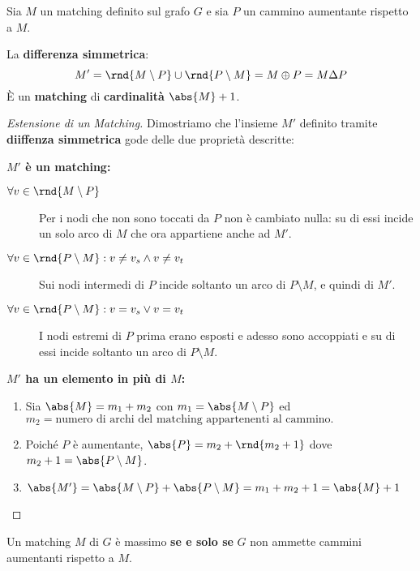 \documentclass[\main/main.tex]{subfiles}
\begin{document}
\begin{theorem}
	Sia \(M\) un matching definito sul grafo \(G\) e sia \(P\) un cammino aumentante rispetto a \(M\).

	La \textbf{differenza simmetrica}:
	\[
		M' = \rnd{M\setminus P} \cup \rnd{P\setminus M} = M \oplus P = M \Delta P
	\]
	È un \textbf{matching} di \textbf{cardinalità} \(\abs{M} + 1\).
\end{theorem}

\begin{proof}[Estensione di un Matching]
	Dimostriamo che l'insieme \(M'\) definito tramite \textbf{diiffenza simmetrica} gode delle due proprietà descritte:
	\begin{description}
		\item \textbf{\(M'\) è un matching:}
		      \begin{description}
			      \item[\(\forall v \in \rnd{M \setminus P}\)] Per i nodi che non sono toccati da \(P\) non è cambiato nulla: su di essi incide un solo arco di \(M\) che ora appartiene anche ad \(M'\).
			      \item[\(\forall v \in \rnd{P \setminus M}: v\neq v_s \land v \neq v_t\)] Sui nodi intermedi di \(P\) incide soltanto un arco di \(P\setminus M\), e quindi di \(M'\).
			      \item[\(\forall v \in \rnd{P \setminus M}: v= v_s \lor v = v_t\)] I nodi estremi di \(P\) prima erano esposti e adesso sono accoppiati e su di essi incide soltanto un arco di \(P\setminus M\).
		      \end{description}
		\item \textbf{\(M'\) ha un elemento in più di \(M\):}
		      \begin{enumerate}
			      \item Sia \(\abs{M} = m_1 + m_2\) con \(m_1 = \abs{M \setminus P}\) ed \(m_2 = \text{numero di archi del matching appartenenti al cammino.}\)
			      \item Poiché \(P\) è aumentante, \(\abs{P} = m_2 + \rnd{m_2 + 1}\) dove \(m_2 + 1 = \abs{P\setminus M}\).
			      \item \(\abs{M'} = \abs{M \setminus P} + \abs{P \setminus M} = m_1 + m_2 + 1 = \abs{M} +1\)
		      \end{enumerate}
	\end{description}
\end{proof}
\clearpage
\begin{theorem}
	Un matching \(M\) di \(G\) è massimo \textbf{se e solo se} \(G\) non ammette cammini aumentanti rispetto a \(M\).
\end{theorem}
\end{document}
